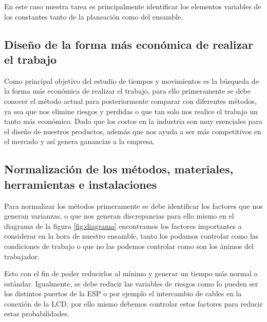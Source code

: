     En este caso nuestra tarea es principalmente identificar los elementos variables de los constantes tanto de la planeación como del ensamble. 
    
    
    \subsection{Diseño de la forma más económica de realizar el trabajo}
    
    
    Como principal objetivo del estudio de tiempos y movimientos es la búsqueda de la forma más económica de realizar el trabajo, para ello primeramente se debe conocer el método actual para posteriormente comparar con diferentes métodos, ya sea que nos elimine riesgos y perdidas o que tan solo nos realice el trabajo un tanto más económico. Dado que los costos en la industria son muy esenciales para el diseño de nuestros productos, además que nos ayuda a ser más competitivos en el mercado y así genera ganancias a la empresa. 
    
    
    
    \subsection{Normalización de los métodos, materiales, herramientas e instalaciones}
    
    
    Para normalizar los métodos primeramente se debe identificar los factores que nos generan varianzas, o que nos generan discrepancias para ello mismo en el diagrama de la figura \ref{fig:diagrama} encontramos los factores importantes a considerar en la hora de nuestro ensamble, tanto los podamos controlar como las condiciones de trabajo o que no las podemos controlar como son los ánimos del trabajador.
    
    
    Esto con el fin de poder reducirlos al mínimo y generar un tiempo más normal o estándar. Igualmente, se debe reducir las variables de riesgos como lo pueden ser los distintos puertos de la ESP o por ejemplo el intercambio de cables en la conexión de la LCD, por ello mismo debemos controlar estos factores para reducir estas probabilidades.
    
